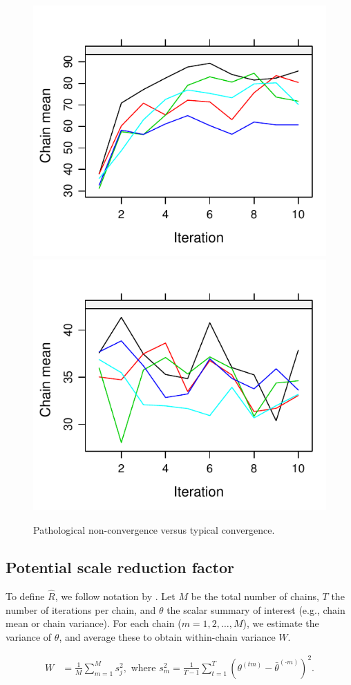 \documentclass[Royal,times,sageh]{sagej}
\begin{document}
\begin{figure}

{\centering \includegraphics[width=.49\linewidth]{manuscript_files/figure-latex/non-conv-1} \includegraphics[width=.49\linewidth]{manuscript_files/figure-latex/non-conv-2} 

}

\caption{Pathological non-convergence versus typical convergence.}\label{fig:non-conv}
\end{figure}

\hypertarget{potential-scale-reduction-factor}{%
\subsection{Potential scale reduction
factor}\label{potential-scale-reduction-factor}}

To define \(\widehat{R}\), we follow notation by \citep[p.~5]{veht19}.
Let \(M\) be the total number of chains, \(T\) the number of iterations
per chain, and \(\theta\) the scalar summary of interest (e.g., chain
mean or chain variance). For each chain (\(m = 1, 2, \dots, M\)), we
estimate the variance of \(\theta\), and average these to obtain
within-chain variance \(W\).

\begin{align*}
W&=\frac{1}{M} \sum_{m=1}^{M} s_{j}^{2},  \text { where } s_{m}^{2}=\frac{1}{T-1} \sum_{t=1}^{T}\left(\theta^{(t m)}-\bar{\theta}^{(\cdot m)}\right)^{2}. 
\end{align*}
\end{document}

